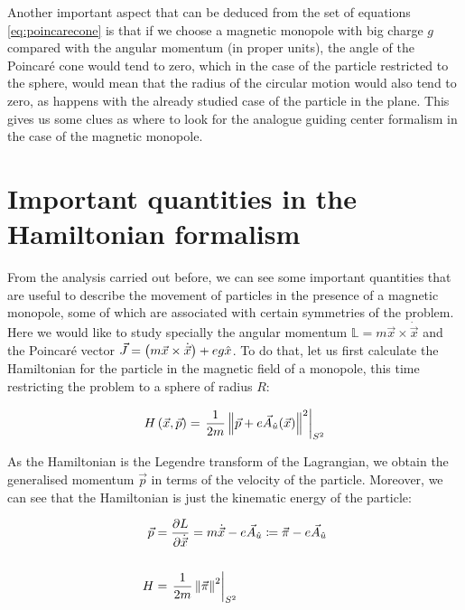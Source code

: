 Another important aspect that can be deduced from the set of equations \eqref{eq:poincarecone} is that if we choose a magnetic monopole with big charge $g$ compared with the angular momentum (in proper units), the angle of the Poincar\'e cone would tend to zero, which in the case of the particle restricted to the sphere, would mean that the radius of the circular motion would also tend to zero, as happens with the already studied case of the particle in the plane. This gives us some clues as where to look for the analogue guiding center formalism in the case of the magnetic monopole.\\

\section{Important quantities in the Hamiltonian formalism}
From the analysis carried out before, we can see some important quantities that are useful to describe the movement of particles in the presence of a magnetic monopole, some of which are associated with certain symmetries of the problem. Here we would like to study specially the angular momentum $\mathbb{L}= m\vec{x}\times\dot{\vec{x}}$ and the Poincar\'e vector $\vec{J} = \left( m\vec{x}\times\dot{\vec{x}} \right)+ eg\hat{x}$. To do that, let us first calculate the Hamiltonian for the particle in the magnetic field of a monopole, this time restricting the problem to a sphere of radius $R$:

\begin{equation}
H\left( \vec{x},\vec{p} \right) = \left.\frac{1}{2m}\left\lVert \vec{p}+e\vec{A}_{\hat{u}}(\vec{x}) \right\rVert^2\right|_{S^2}
\label{hamiltonian}
\end{equation}

As the Hamiltonian is the Legendre transform of the Lagrangian, we obtain the generalised momentum $\vec{p}$  in terms of the velocity of the particle. Moreover, we can see that the Hamiltonian is just the kinematic energy of the particle:

\begin{equation*}
\begin{aligned}
\vec{p} &= \frac{\partial L}{\partial \dot{\vec{x}}} = m\dot{\vec{x}}-e\vec{A}_{\hat{u}} \coloneqq \vec{\pi}-e\vec{A}_{\hat{u}} \\
\\
H &= \left.\frac{1}{2m}\left\lVert \vec{\pi} \right\rVert^2\right|_{S^2}
\end{aligned}
\end{equation*}


